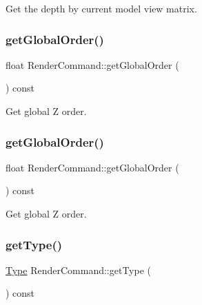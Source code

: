 Get the depth by current model view matrix. \mbox{\label{classRenderCommand_a985166e1d5e2e76d8c2e898df9affe27}} 
\subsubsection{\texorpdfstring{get\+Global\+Order()}{getGlobalOrder()}\hspace{0.1cm}{\footnotesize\ttfamily [1/2]}}
{\footnotesize\ttfamily float Render\+Command\+::get\+Global\+Order (\begin{DoxyParamCaption}{ }\end{DoxyParamCaption}) const\hspace{0.3cm}{\ttfamily [inline]}}

Get global Z order. \mbox{\label{classRenderCommand_a985166e1d5e2e76d8c2e898df9affe27}} 
\subsubsection{\texorpdfstring{get\+Global\+Order()}{getGlobalOrder()}\hspace{0.1cm}{\footnotesize\ttfamily [2/2]}}
{\footnotesize\ttfamily float Render\+Command\+::get\+Global\+Order (\begin{DoxyParamCaption}{ }\end{DoxyParamCaption}) const\hspace{0.3cm}{\ttfamily [inline]}}

Get global Z order. \mbox{\label{classRenderCommand_aede03e6c9ee6d5382aa9eb64a9f1efb0}} 
\subsubsection{\texorpdfstring{get\+Type()}{getType()}\hspace{0.1cm}{\footnotesize\ttfamily [1/2]}}
{\footnotesize\ttfamily \hyperlink{classRenderCommand_a17af6f8ac8e8a22a9007287a70ae5d1e}{Type} Render\+Command\+::get\+Type (\begin{DoxyParamCaption}{ }\end{DoxyParamCaption}) const\hspace{0.3cm}{\ttfamily [inline]}}

